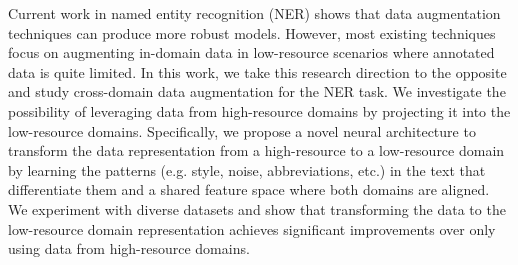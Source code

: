 Current work in named entity recognition (NER) shows that data augmentation techniques can produce more robust models. However, most existing techniques focus on augmenting in-domain data in low-resource scenarios where annotated data is quite limited. In this work, we take this research direction to the opposite and study cross-domain data augmentation for the NER task. We investigate the possibility of leveraging data from high-resource domains by projecting it into the low-resource domains. Specifically, we propose a novel neural architecture to transform the data representation from a high-resource to a low-resource domain by learning the patterns (e.g. style, noise, abbreviations, etc.) in the text that differentiate them and a shared feature space where both domains are aligned. We experiment with diverse datasets and show that transforming the data to the low-resource domain representation achieves significant improvements over only using data from high-resource domains.
